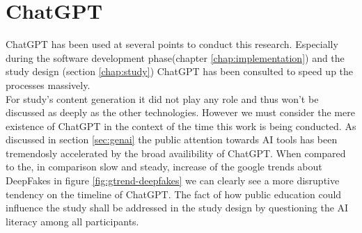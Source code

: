 \documentclass[
  a4paper,  %
  twoside,  %
  bibliography=totoc,
  headsepline,
  cleardoublepage=empty,
  parskip=half,
  draft=false
]{scrbook}
\begin{document}
\section{ChatGPT}
ChatGPT has been used at several points to conduct this research. Especially during the software development phase(chapter \ref{chap:implementation}) and the study design (section \ref{chap:study}) ChatGPT has been consulted to speed up the processes massively. \\ 
For study's content generation it did not play any role and thus won't be discussed as deeply as the other technologies. However we must consider the mere existence of ChatGPT in the context of the time this work is being conducted. As discussed in section \ref{sec:genai} the public attention towards AI tools has been tremendosly accelerated by the broad availibility of ChatGPT. When compared to the, in comparison slow and steady, increase of the google trends about DeepFakes in figure \ref{fig:gtrend-deepfakes} we can clearly see a more disruptive tendency on the timeline of ChatGPT.
The fact of how public education could influence the study shall be addressed in the study design by questioning the AI literacy among all participants. 
\end{document}
